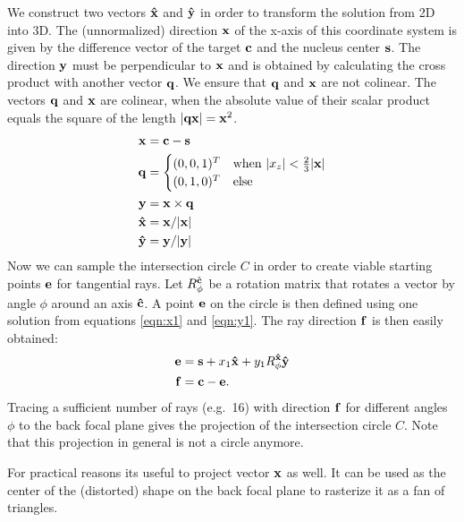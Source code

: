 We construct two vectors $\mathbf{\hat{x}}$ and $\mathbf{\hat{y}}$ in order to transform the
solution from 2D into 3D. The (unnormalized) direction $\mathbf{x}$ of the
x-axis of this coordinate system is given by the difference vector of
the target $\mathbf{c}$ and the nucleus center $\mathbf{s}$. The direction $\mathbf{y}$ must
be perpendicular to $\mathbf{x}$ and is obtained by calculating the cross
product with another vector $\mathbf{q}$.  We ensure that $\mathbf{q}$ and $\mathbf{x}$ are
not colinear. The vectors $\mathbf{q}$ and $\mathbf{x}$ are colinear, when the
absolute value of their scalar product equals the square of the length
$\mathopen| \mathbf{q}\mathbf{x} \mathclose|=\mathbf{x}^2$.
\begin{align}
  \mathbf{x}&=\mathbf{c}-\mathbf{s}\\
  \mathbf{q}&=\begin{cases}
    (0,0,1)^T & \textrm{when}\ \mathopen| x_z \mathclose|<\frac{2}{3}\mathopen| \mathbf{x} \mathclose|\\
    (0,1,0)^T & \textrm{else}
  \end{cases}\\
  \mathbf{y}&=\mathbf{x}\times\mathbf{q} \\
  \mathbf{\hat{x}}&=\mathbf{x}/\mathopen| \mathbf{x} \mathclose|\\
  \mathbf{\hat{y}}&=\mathbf{y}/\mathopen| \mathbf{y} \mathclose|
\end{align}
Now we can sample the intersection circle $C$ in order to create
viable starting points $\mathbf{e}$ for tangential rays.  Let $R_\phi^{\mathbf{\hat{c}}}$ be
a rotation matrix that rotates a vector by angle $\phi$ around an axis
$\mathbf{\hat{c}}$. A point $\mathbf{e}$ on the circle is then defined using one solution
from equations \ref{eqn:x1} and \ref{eqn:y1}. The ray direction $\mathbf{f}$
is then easily obtained:
\begin{align}
  \mathbf{e}&=\mathbf{s}+x_1\mathbf{\hat{x}}+y_1R_\phi^{\mathbf{\hat{x}}}\mathbf{\hat{y}}\\
  \mathbf{f}&=\mathbf{c}-\mathbf{e}.
\end{align}
Tracing a sufficient number of rays (e.g.\ 16) with direction $\mathbf{f}$ for
different angles $\phi$ to the back focal plane gives the projection
of the intersection circle $C$. Note that this projection in general
is not a circle anymore.

For practical reasons its useful to project vector $\mathbf{x}$ as well. It
can be used as the center of the (distorted) shape on the back focal
plane to rasterize it as a fan of triangles.



